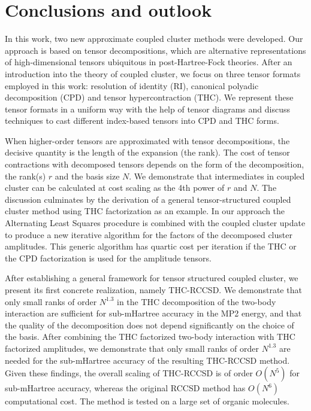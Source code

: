 \chapter{Conclusions and outlook
\label{ch:conclusions}}
In this work, two new approximate coupled cluster methods were developed. Our 
approach is based on tensor decompositions, which are alternative 
representations of high-dimensional tensors ubiquitous in post-Hartree-Fock 
theories. After an introduction into the theory of coupled cluster, we 
focus on three tensor formats employed in this work: resolution of 
identity (RI), canonical polyadic decomposition (CPD) and tensor 
hypercontraction (THC). We represent these tensor formats in a uniform way 
with the help of tensor diagrams and discuss techniques to cast different 
index-based tensors into CPD and THC forms. 

When higher-order tensors are approximated with tensor decompositions, the 
decisive quantity is the length of the expansion (the rank). The cost of 
tensor contractions with decomposed tensors depends on the form of the 
decomposition, the rank(s) $r$ and the basis size $N$. We 
demonstrate that intermediates in coupled cluster can be calculated at 
cost scaling as the 4th power of $r$ and $N$. The discussion culminates by 
the derivation of a general tensor-structured coupled cluster method using THC 
factorization as an example. In our approach the Alternating Least Squares 
procedure is combined with the coupled cluster update to produce a new 
iterative algorithm for the factors of the decomposed cluster amplitudes. This 
generic algorithm has quartic cost per iteration if the THC or the CPD 
factorization is used for the amplitude tensors.

After establishing a general framework for tensor structured coupled cluster, 
we present its first concrete realization, namely THC-RCCSD. We demonstrate 
that only small ranks of order $N^{1.3}$ in the THC decomposition of 
the two-body interaction are sufficient for sub-mHartree accuracy in the MP2 
energy, and that the quality of the decomposition does not depend significantly 
on the choice of the basis. After combining the THC factorized two-body 
interaction with THC factorized amplitudes, we demonstrate that only small ranks 
of order $N^{1.3}$ are needed for the sub-mHartree accuracy of the resulting 
THC-RCCSD method. Given these findings, the overall scaling of THC-RCCSD is 
of order 
$O(N^{5})$ for sub-mHartree accuracy, whereas the original RCCSD method has 
$O(N^{6})$ computational cost. The method is tested on a large set of organic 
molecules.   

